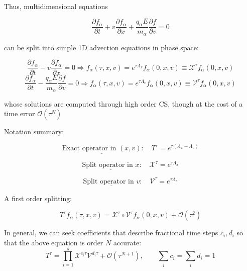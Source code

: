 \documentclass{beamer}
\begin{document}
\begin{frame}{\subsecname}

Thus, multidimensional equations 

$$\frac{\partial f_{\alpha}}{\partial t} + v\frac{\partial f_{\alpha}}{\partial x} + \frac{q_{\alpha}E}{m_{\alpha}}\frac{\partial f}{\partial v} = 0$$

can be split into simple 1D advection equations in phase space:

$$\frac{\partial f_{\alpha}}{\partial t} - v\frac{\partial f_{\alpha}}{\partial x}  =  0  \Rightarrow  f_{\alpha}(\tau ,x,v) = e^{\tau \Lambda_x}f_{\alpha}(0,x,v) \equiv \mathcal{X}^{\tau}f_{\alpha}(0,x,v)$$
$$\frac{\partial f_{\alpha}}{\partial t} - \frac{q_{\alpha}E}{m_{\alpha}}\frac{\partial f}{\partial v} =  0  \Rightarrow  f_{\alpha}(\tau ,x,v) = e^{\tau \Lambda_v}f_{\alpha}(0,x,v) \equiv \mathcal{V}^{\tau}f_{\alpha}(0,x,v)$$

whose solutions are computed through high order CS, though at the cost of a time error $\mathcal{O}(\tau^N)$
 

\end{frame}


\begin{frame}{\subsecname}

Notation summary: 

$$\underline{\text{Exact operator in } (x,v)}: \quad T^{\tau} = e^{\tau(\Lambda_x + \Lambda_v)}$$
 
$$\underline{\text{Split operator in } x}: \quad \mathcal{X}^{\tau} = e^{\tau\Lambda_x}$$
 
$$\underline{\text{Split operator in } v}: \quad \mathcal{V}^{\tau} = e^{\tau\Lambda_v}$$

A first order splitting:
 
$$T^{\tau}f_{\alpha}(\tau,x,v) = \mathcal{X}^{\tau}\circ\mathcal{V}^{\tau}f_{\alpha}(0,x,v) + \mathcal{O}(\tau^2)$$

In general, we can seek coefficients that describe fractional time steps $c_i, d_i$ so that the above equation is order $N$ accurate:
$$T^{\tau} = \prod_{i=1}^s \mathcal{X}^{c_i\tau} \mathcal{V}^{d_i\tau} + \mathcal{O}(\tau^{N+1}),\qquad \sum_i c_i = \sum_i d_i = 1$$

\end{frame}
\end{document}
